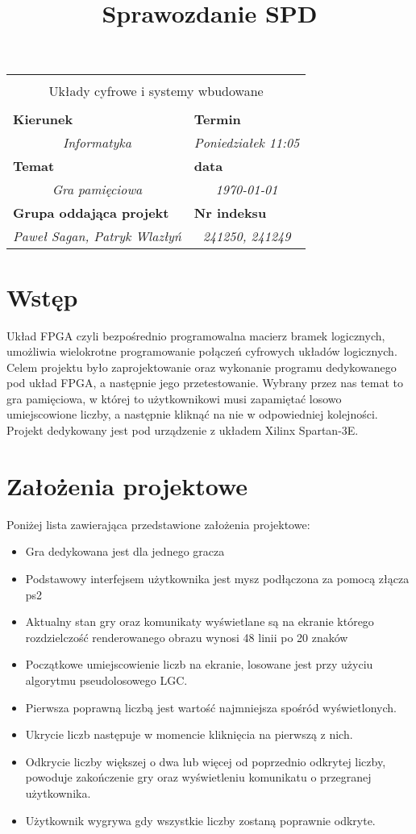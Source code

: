\documentclass[polish,polish,a4paper]{article}
\title{Sprawozdanie SPD}
\newcommand{\name}[1]{\sffamily\bfseries\scriptsize #1}
\newcommand{\frontpage}[8]{

\vspace{2cm}

\begin{tabular}{|p{0.72\textwidth}|p{0.28\textwidth}|}
\hline
\multicolumn{2}{|c|}{}\\
\multicolumn{2}{|c|}{{\LARGE #1}}\\
\multicolumn{2}{|c|}{}\\
\hline
\name{Kierunek} & \name{Termin}\\
\multicolumn{1}{|c|}{\textit{#2}} & \multicolumn{1}{|c|}{\textit{#3}} \\
\hline
\name{Temat} & \name{data}\\
\multicolumn{1}{|c|}{\textit{#4}} & \multicolumn{1}{|c|}{\textit{#5}} \\
\hline
\name{Grupa oddająca projekt} & \name{Nr indeksu}\\
\multicolumn{1}{|c|}{\textit{#6}} & \multicolumn{1}{|c|}{\textit{#7}} \\
\hline
\end{tabular}
}
\begin{document}
\frontpage{Układy cyfrowe i systemy wbudowane}{Informatyka}{Poniedziałek 11:05}{Gra pamięciowa}{\today}{Paweł Sagan, Patryk Wlazłyń}{241250, 241249}
\pagestyle{}
\newpage
\tableofcontents
\newpage
\section{Wstęp}
Układ FPGA czyli bezpośrednio programowalna macierz bramek logicznych, umożliwia wielokrotne programowanie połączeń cyfrowych układów logicznych. Celem projektu było zaprojektowanie oraz wykonanie programu dedykowanego pod układ FPGA, a następnie jego przetestowanie. Wybrany przez nas temat to gra pamięciowa, w której to użytkownikowi musi zapamiętać losowo umiejscowione liczby, a następnie kliknąć na nie w odpowiedniej kolejności. Projekt dedykowany jest pod urządzenie z układem Xilinx Spartan-3E.

\section{Założenia projektowe}
Poniżej lista zawierająca przedstawione założenia projektowe:
\begin{itemize}
  \item Gra dedykowana jest dla jednego gracza
  \item Podstawowy interfejsem użytkownika jest mysz podłączona za pomocą złącza ps2
  \item Aktualny stan gry oraz komunikaty wyświetlane są na ekranie którego rozdzielczość renderowanego obrazu wynosi 48 linii po 20 znaków
  \item Początkowe umiejscowienie liczb na ekranie, losowane jest przy użyciu algorytmu pseudolosowego LGC.
  \item Pierwsza poprawną liczbą jest wartość najmniejsza spośród wyświetlonych.
  \item Ukrycie liczb następuje w momencie kliknięcia na pierwszą z nich.
  \item Odkrycie liczby większej o dwa lub więcej od poprzednio odkrytej liczby, powoduje zakończenie gry oraz wyświetleniu komunikatu o przegranej użytkownika.
  \item Użytkownik wygrywa gdy wszystkie liczby zostaną poprawnie odkryte. 
\end{itemize}
\end{document}
